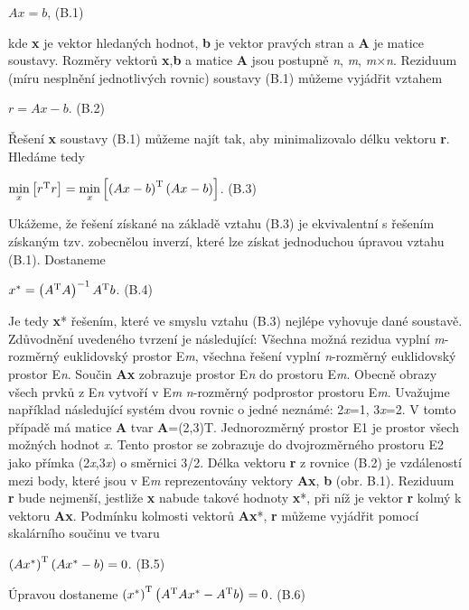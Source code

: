  $Ax=b$, (B.1)

\noindent kde \textbf{x} je vektor hledaných hodnot, \textbf{b} je vektor pravých stran a \textbf{A} je matice soustavy. Rozměry vektorů \textbf{x},\textbf{b} a matice \textbf{A} jsou postupně \textit{n}, \textit{m}, \textit{m}$\times$\textit{n}. Reziduum (míru nesplnění jednotlivých rovnic) soustavy (B.1) můžeme vyjádřit vztahem

 $r=Ax-b$. (B.2)

\noindent Řešení \textbf{x} soustavy (B.1) můžeme najít tak, aby minimalizovalo délku vektoru \textbf{r}. Hledáme tedy

 $\mathop{\min }\limits_{x} \left[r^{{\rm T}} r\right]=\mathop{\min }\limits_{x} \left[\left(Ax-b\right)^{{\rm T}} \left(Ax-b\right)\right]$. (B.3)

\noindent Ukážeme, že řešení získané na základě vztahu (B.3) je ekvivalentní s řešením získaným tzv. zobecnělou inverzí, které lze získat jednoduchou úpravou vztahu (B.1). Dostaneme

 $x^{*} =\left(A^{{\rm T}} A\right)^{-1} A^{{\rm T}} b$. (B.4)

\noindent 

\noindent Je tedy \textbf{x}* řešením, které ve smyslu vztahu (B.3) nejlépe vyhovuje dané soustavě. Zdůvodnění uvedeného tvrzení je následující: Všechna možná rezidua vyplní \textit{m}-rozměrný euklidovský prostor E\textit{m}, všechna řešení vyplní \textit{n}-rozměrný euklidovský prostor E\textit{n}. Součin \textbf{Ax} zobrazuje prostor E\textit{n} do prostoru E\textit{m}. Obecně obrazy všech prvků z E\textit{n} vytvoří v E\textit{m} \textit{n}-rozměrný podprostor prostoru E\textit{m}. Uvažujme například následující systém dvou rovnic o jedné neznámé: 2\textit{x}=1, 3\textit{x}=2. V tomto případě má matice \textbf{A} tvar \textbf{A}=(2,3)T. Jednorozměrný prostor E1 je prostor všech možných hodnot \textit{x}. Tento prostor se zobrazuje do dvojrozměrného prostoru E2 jako přímka (2\textit{x},3\textit{x}) o směrnici 3/2. Délka vektoru \textbf{r} z rovnice (B.2) je vzdáleností mezi body, které jsou v E\textit{m} reprezentovány vektory \textbf{Ax}, \textbf{b} (obr. B.1). Reziduum \textbf{r} bude nejmenší, jestliže \textbf{x} nabude takové hodnoty \textbf{x}*, při níž je vektor \textbf{r} kolmý k vektoru \textbf{Ax}. Podmínku kolmosti vektorů \textbf{Ax}*, \textbf{r} můžeme vyjádřit pomocí skalárního součinu ve tvaru 

 $\left(Ax^{*} \right)^{{\rm T}} \left(Ax^{*} -b\right)=0$. (B.5)

\noindent Úpravou dostaneme $\left(x^{*} \right)^{{\rm T}} \left(A^{{\rm T}} Ax^{*} -A^{{\rm T}} b\right)=0$. (B.6)

